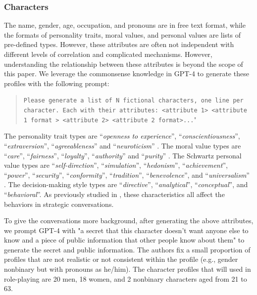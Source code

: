 \subsubsection{Characters}
The name, gender, age, occupation, and pronouns are in free text format, while the formats of personality traits, moral values, and personal values are lists of pre-defined types. However, these attributes are often not independent with different levels of correlation and complicated mechanisms. \citep{feldman1985personality,el2020personality,toledo2023neurocircuitry} However, understanding the relationship between these attributes is beyond the scope of this paper. We leverage the commonsense knowledge in GPT-4 to generate these profiles with the following prompt: 
\begin{quote}
\texttt{Please generate a list of N fictional characters, one line per character. Each with their attributes: <attribute 1> <attribute 1 format > <attribute 2> <attribute 2 format>...}"
\end{quote}
The personality trait types are ``\emph{openness to experience}'', ``\emph{conscientiousness}'', ``\emph{extraversion}'', ``\emph{agreeableness}'' and ``\emph{neuroticism}'' \citep{goldberg1992-jf}. The moral value types are ``\emph{care}'', ``\emph{fairness}'', ``\emph{loyalty}'', ``\emph{authority}'' and ``\emph{purity}'' \citep{cieciuch_davidov_2012}. The Schwartz personal value types are ``\emph{self-direction}'', ``\emph{simulation}'', ``\emph{hedonism}'', ``\emph{achievement}'', ``\emph{power}'', ``\emph{security}'', ``\emph{conformity}'', ``\emph{tradition}'', ``\emph{benevolence}'', and ``\emph{universalism}'' \cite{cieciuch_davidov_2012}. The decision-making style types are ``\emph{directive}'', ``\emph{analytical}'', ``\emph{conceptual}'', and ``\emph{behavioral}''. 
As previously studied in \citet{wang-etal-2019-persuasion}, these characteristics all affect the behaviors in strategic conversations. 

To give the conversations more background, after generating the above attributes, we prompt GPT-4 with "a secret that this character doesn't want anyone else to know and a piece of public information that other people know about them" to generate the secret and public information. The authors fix a small proportion of profiles that are not realistic or not consistent within the profile (e.g., gender nonbinary but with pronouns as he/him). 
The character profiles that will used in role-playing are 20 men, 18 women, and 2 nonbinary characters aged from 21 to 63. 

